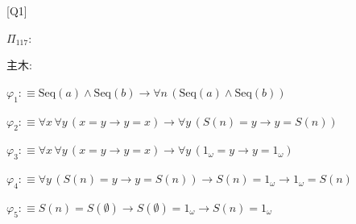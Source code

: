 \begin{fullproof}{[Q1]}
\begin{ptree}
\noLine
{}
\end{ptree}
\noindent$\Pi_{117}$:
\begin{ptree}
\noLine
{}
\noLine
{}
\end{ptree}
\noindent 主木:
\begin{ptree}
\noLine
{}
\end{ptree}
\begin{abbrevlist}
\item $\varphi_{1} :\equiv \mathrm{Seq}(a) \land \mathrm{Seq}(b) \to \forall n\,(\mathrm{Seq}(a) \land \mathrm{Seq}(b))$
\item $\varphi_{2} :\equiv \forall x\,\forall y\,(x = y \to y = x) \to \forall y\,(S(n) = y \to y = S(n))$
\item $\varphi_{3} :\equiv \forall x\,\forall y\,(x = y \to y = x) \to \forall y\,(1_{\omega} = y \to y = 1_{\omega})$
\item $\varphi_{4} :\equiv \forall y\,(S(n) = y \to y = S(n)) \to S(n) = 1_{\omega} \to 1_{\omega} = S(n)$
\item $\varphi_{5} :\equiv S(n) = S(\emptyset) \to S(\emptyset) = 1_{\omega} \to S(n) = 1_{\omega}$

\end{abbrevlist}
\end{fullproof}
